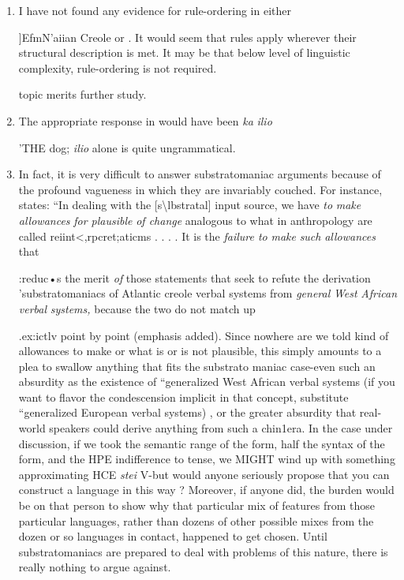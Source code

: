 \begin{enumerate}
\item I have not found any evidence for rule-ordering in either 

]EfmN'aiian Creole  or . It would seem that rules apply wherever their structural description is met. It may be that below level of linguistic complexity, rule-ordering is not required.

topic merits further study.
 
\item The appropriate response in  would have been \textit{ka} \textit{ilio} 

'THE dog; \textit{ilio} alone is quite ungrammatical.
 
\item In fact, it is very difficult to answer substratomaniac argu\-ments because of the profound vagueness in which they are invariably couched. For instance, \citet{Alleyne1979} states: ``In dealing with the [s{\textbackslash}lbstratal] input source, we have \textit{to} \textit{make allowances} \textit{for plausible} \textit{of change }analogous to what in anthropology are called reiint{\textless},rpcret;aticms . . . . It is the \textit{failure to} \textit{make} \textit{such} \textit{allowances} that
 

:reduc•s the merit \textit{of} those statements that seek to refute the derivation 'substratomaniacs of Atlantic creole verbal systems from \textit{general\-} \textit{West} \textit{African verbal} \textit{systems,} because the two do not match up

.ex:ictlv point by point (emphasis added). Since nowhere are we told kind of allowances to make or what is or is not plausible, this simply amounts to a plea to swallow anything that fits the substrato%
maniac case{}-even such an absurdity as the existence of ``generalized West African verbal systems (if you want to flavor the condescension implicit in that concept, substitute ``generalized European verbal systems{\textquotedbl}) , or the greater absurdity that real-world speakers could derive anything from such a chin1era. In the case under discussion, if we took the semantic range of the  form, half the syntax of the  form, and the HPE indifference to tense, we MIGHT wind up with something approximating HCE \textit{stei} V{}-but would anyone seriously propose that you can construct a language in this way ? Moreover, if anyone did, the burden would be on that person to show why that particular mix of features from those particular languages, rather than dozens of other possible mixes from the dozen or so lan\-guages in contact, happened to get chosen. Until substratomaniacs are prepared to deal with problems of this nature, there is really nothing
to argue against.
 

\end{enumerate}
